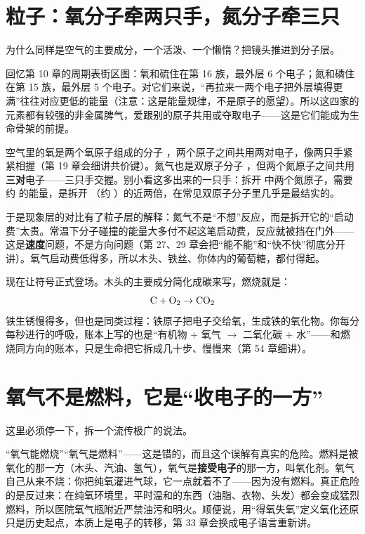 \section{粒子：氧分子牵两只手，氮分子牵三只}

为什么同样是空气的主要成分，一个活泼、一个懒惰？把镜头推进到分子层。

回忆第 10 章的周期表街区图：氧和硫住在第 16 族，最外层 6 个电子；氮和磷住在第 15 族，最外层 5 个电子。对它们来说，“再拉来一两个电子把外层填得更满”往往对应更低的能量（注意：这是能量规律，不是原子的愿望）。所以这四家的元素都有较强的非金属脾气，爱跟别的原子共用或夺取电子——这是它们能成为生命骨架的前提。

空气里的氧是两个氧原子组成的分子 ，两个原子之间共用两对电子，像两只手紧紧相握（第 19 章会细讲共价键）。氮气也是双原子分子 ，但两个氮原子之间共用\textbf{三对}电子——三只手交握。别小看这多出来的一只手：拆开  中两个氮原子，需要约  的能量，是拆开 （约 ）的近两倍，在常见双原子分子里几乎是最结实的。

于是现象层的对比有了粒子层的解释：氮气不是“不想”反应，而是拆开它的“启动费”太贵。常温下分子碰撞的能量大多付不起这笔启动费，反应就被挡在门外——这是\textbf{速度}问题，不是方向问题（第 27、29 章会把“能不能”和“快不快”彻底分开讲）。氧气启动费低得多，所以木头、铁丝、你体内的葡萄糖，都付得起。

现在让符号正式登场。木头的主要成分简化成碳来写，燃烧就是：
\[\mathrm{C} + \mathrm{O_2} \rightarrow \mathrm{CO_2}\]
铁生锈慢得多，但也是同类过程：铁原子把电子交给氧，生成铁的氧化物。你每分每秒进行的呼吸，账本上写的也是“有机物 $+$ 氧气 $\rightarrow$ 二氧化碳 $+$ 水”——和燃烧同方向的账本，只是生命把它拆成几十步、慢慢来（第 54 章细讲）。

\section{氧气不是燃料，它是“收电子的一方”}

这里必须停一下，拆一个流传极广的说法。

\begin{wuqu}
“氧气能燃烧”“氧气是燃料”——这是错的，而且这个误解有真实的危险。燃料是被氧化的那一方（木头、汽油、氢气），氧气是\textbf{接受电子}的那一方，叫氧化剂。氧气自己从来不烧：你把纯氧灌进气球，它一点就着不了——因为没有燃料。真正危险的是反过来：在纯氧环境里，平时温和的东西（油脂、衣物、头发）都会变成猛烈燃料，所以医院氧气瓶附近严禁油污和明火。顺便说，用“得氧失氧”定义氧化还原只是历史起点，本质上是电子的转移，第 33 章会换成电子语言重新讲。
\end{wuqu}

